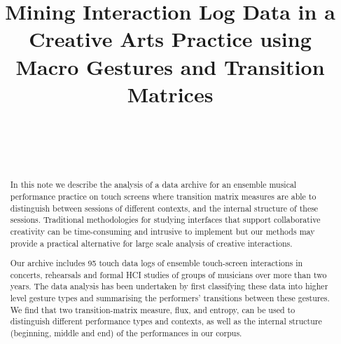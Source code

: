 \documentclass{sigchi}
\begin{document}
 
\title{Mining Interaction Log Data in a Creative Arts Practice using Macro Gestures and Transition Matrices}



\author{%
  \\
  \\
  \\
}

\maketitle

\begin{abstract}
  In this note we describe the analysis of a data archive for an
  ensemble musical performance practice on touch screens where
  transition matrix measures are able to distinguish between sessions
  of different contexts, and the internal structure of these sessions.
  Traditional methodologies for studying interfaces that support
  collaborative creativity can be time-consuming and intrusive to
  implement but our methods may provide a practical alternative for
  large scale analysis of creative interactions.

  Our archive includes 95 touch data logs of ensemble touch-screen
  interactions in concerts, rehearsals and formal HCI studies of
  groups of musicians over more than two years. The data analysis has
  been undertaken by first classifying these data into higher level
  gesture types and summarising the performers' transitions between
  these gestures. We find that two transition-matrix measure, flux,
  and entropy, can be used to distinguish different performance types
  and contexts, as well as the internal structure (beginning, middle
  and end) of the performances in our corpus.
\end{abstract}
\end{document}
